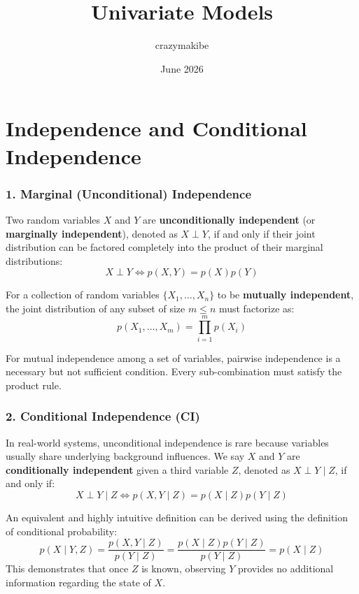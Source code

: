 \documentclass{article}
\title{Univariate Models}
\author{crazymakibe}
\date{June 2026}
\begin{document}
\maketitle

\section*{Independence and Conditional Independence}

\subsubsection*{1. Marginal (Unconditional) Independence}
Two random variables $X$ and $Y$ are \textbf{unconditionally independent} (or \textbf{marginally independent}), denoted as $X \perp Y$, if and only if their joint distribution can be factored completely into the product of their marginal distributions:
\begin{equation}
    X \perp Y \iff p(X, Y) = p(X)p(Y)
\end{equation}

\noindent For a collection of random variables $\{X_1, \dots, X_n\}$ to be \textbf{mutually independent}, the joint distribution of any subset of size $m \le n$ must factorize as:
\begin{equation}
    p(X_1, \dots, X_m) = \prod_{i=1}^{m} p(X_i)
\end{equation}

\begin{tcolorbox}[colback=yellow!5!white, colframe=yellow!60!black, title=Important Distinction]
For mutual independence among a set of variables, pairwise independence is a necessary but not sufficient condition. Every sub-combination must satisfy the product rule.
\end{tcolorbox}

\subsubsection*{2. Conditional Independence (CI)}
In real-world systems, unconditional independence is rare because variables usually share underlying background influences. We say $X$ and $Y$ are \textbf{conditionally independent} given a third variable $Z$, denoted as $X \perp Y \mid Z$, if and only if:
\begin{equation}
    X \perp Y \mid Z \iff p(X, Y \mid Z) = p(X \mid Z)p(Y \mid Z)
\end{equation}

An equivalent and highly intuitive definition can be derived using the definition of conditional probability:
\begin{equation}
    p(X \mid Y, Z) = \frac{p(X, Y \mid Z)}{p(Y \mid Z)} = \frac{p(X \mid Z)p(Y \mid Z)}{p(Y \mid Z)} = p(X \mid Z)
\end{equation}
This demonstrates that once $Z$ is known, observing $Y$ provides no additional information regarding the state of $X$.
\end{document}
